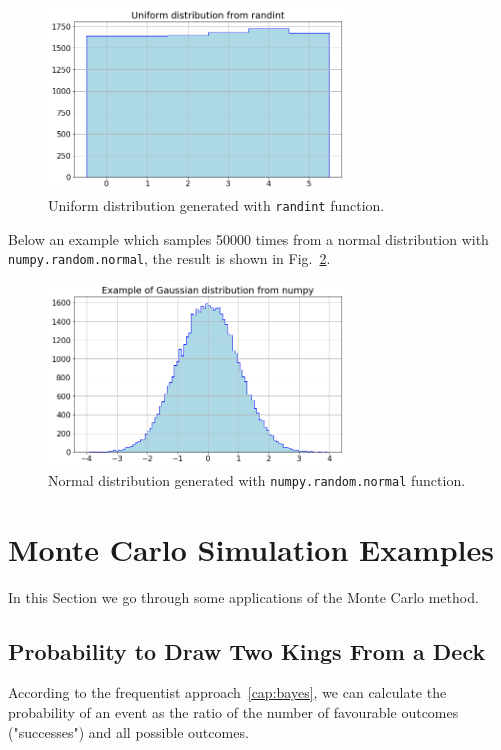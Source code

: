 
\begin{figure}[h]
\centering
\includegraphics[width=0.7\textwidth]{figures/uniform}
\caption{Uniform distribution generated with \texttt{randint} function.}
\label{fig:uniform_dist}
\end{figure}
    
Below an example which samples 50000 times from a normal distribution  with \texttt{numpy.random.normal}, the result is shown in Fig.~\ref{fig:gauss_dist}.


\begin{figure}
\centering
\includegraphics[width=0.7\textwidth]{figures/standard_normal}
\caption{Normal distribution generated with \texttt{numpy.random.normal} function.}
\label{fig:gauss_dist}
\end{figure}

\section{Monte Carlo Simulation Examples}
\label{example-of-monte-carlo-simulation}

In this Section we go through some applications of the Monte Carlo method.

\subsection{Probability to Draw Two Kings From a Deck}
According to the frequentist approach~\ref{cap:bayes}, we can calculate the probability of an event as the ratio of the number of favourable outcomes ("successes") and all possible outcomes. 

